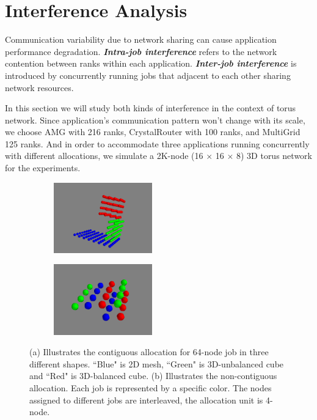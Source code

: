 \documentclass[conference]{IEEEtran}
\begin{document}
\section{Interference Analysis}
\label{sec:interference}

Communication variability due to network sharing can cause application performance degradation. \textbf{\emph{Intra-job interference}} refers to the network contention between ranks within each application. \textbf{\emph{Inter-job interference}} is introduced by concurrently running jobs that adjacent to each other sharing network resources. 

In this section we will study both kinds of interference in the context of torus network. 
Since application's communication pattern won't change with its scale, we choose AMG with 216 ranks, CrystalRouter with 100 ranks, and MultiGrid 125 ranks. And in order to accommodate three applications running concurrently with different allocations, we simulate a 2K-node (16 $\times$ 16 $\times$ 8) 3D torus network for the experiments.

\begin{figure}[t!]
    \centering
    \begin{subfigure}[t]{0.2\textwidth}
        \centering
        \includegraphics[height=1.2in]{figs/cont/allocation}
        \caption{ }
        \label{fig:cont_sub1}
    \end{subfigure}%
    \hspace{1em}%
    \begin{subfigure}[t]{0.2\textwidth}
        \centering
        \includegraphics[height=1.2in]{figs/inter-job/noncont/sharing}
        \caption{ }
        \label{fig:noncont_sub1}
    \end{subfigure}%
    \caption{(a) Illustrates the contiguous allocation for 64-node job in three different shapes. ``Blue" is 2D mesh, ``Green" is 3D-unbalanced cube and ``Red" is 3D-balanced cube. (b) Illustrates the non-contiguous allocation. Each job is represented by a specific color. The nodes assigned to different jobs are interleaved, the allocation unit is 4-node.}
\end{figure}
\end{document}
